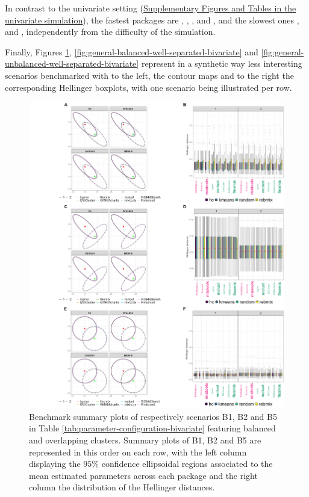In contrast to the univariate setting (\protect\hyperlink{supplementary-figures-and-tables-in-the-univariate-simulation}{Supplementary Figures and Tables in the univariate simulation}), the fastest packages are , , , and , and the slowest ones ,  and , independently from the difficulty of the simulation.

Finally, Figures \ref{fig:general-balanced-overlapping-bivariate}, \ref{fig:general-balanced-well-separated-bivariate} and \ref{fig:general-unbalanced-well-separated-bivariate} represent in a synthetic way less interesting scenarios benchmarked with to the left, the contour maps and to the right the corresponding Hellinger boxplots, with one scenario being illustrated per row.

\begin{figure}

{\centering \includegraphics[width=1\linewidth]{figs/bivariate/multivariate_balanced_overlapping} 

}

\caption{Benchmark summary plots of respectively scenarios B1, B2 and B5 in Table \ref{tab:parameter-configuration-bivariate} featuring balanced and overlapping clusters. Summary plots of B1, B2 and B5 are represented in this order on each row, with the left column displaying the $95\%$ confidence ellipsoidal regions associated to the mean estimated parameters across each package and the right column the distribution of the Hellinger distances.}\label{fig:general-balanced-overlapping-bivariate}
\end{figure}

